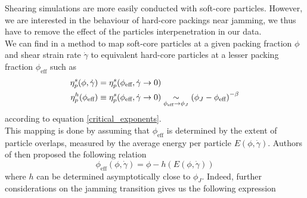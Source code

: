 \documentclass[class=article, float=false, crop=false]{standalone}
\begin{document}
Shearing simulations are more easily conducted with soft-core particles. However, we are interested in the behaviour of hard-core packings near jamming, we thus have to remove the effect of the particles interpenetration in our data.\\

We can find in \cite{PRL109.108001} a method to map soft-core particles at a given packing fraction $\phi$ and shear strain rate $\dot{\gamma}$ to equivalent hard-core particles at a lesser packing fraction $\phi_{\text{eff}}$ such as
\begin{equation}
\begin{aligned}
\eta^s_p(\phi,\dot{\gamma}) &= \eta^s_p(\phi_{\text{eff}},\dot{\gamma}\rightarrow0)\\
\eta^h_p(\phi_{\text{eff}}) &\equiv \eta^s_p(\phi_{\text{eff}},\dot{\gamma}\rightarrow0) \underset{\phi_{\text{eff}}\rightarrow\phi_J}{\sim} \left(\phi_J - \phi_{\text{eff}}\right)^{-\beta}
\label{phieff}
\end{aligned}
\end{equation}
according to equation \ref{critical_exponents}.\\

This mapping is done by assuming that $\phi_{\text{eff}}$ is determined by the extent of particle overlaps, measured by the average energy per particle $E(\phi,\dot{\gamma})$. Authors of \cite{PRL109.108001} then proposed the following relation
\begin{equation}
\phi_{\text{eff}}(\phi,\dot{\gamma}) = \phi - h(E(\phi,\dot{\gamma}))
\label{phieff_}
\end{equation}
where $h$ can be determined asymptotically close to $\phi_J$. Indeed, further considerations on the jamming transition gives us the following expression


\end{document}
